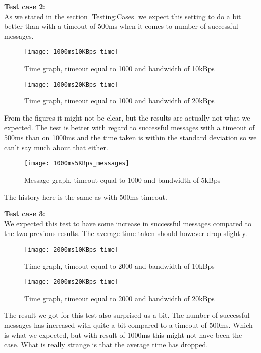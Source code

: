     \textbf{Test case 2:}\\
    As we stated in the section \ref{Testing:Cases} we expect this setting to do a bit better than with a timeout of 500ms when it comes to number of successful messages.
    \begin{figure}[H]
		\centering
		\texttt{[image: 1000ms10KBps\_time]}
		\caption{Time graph, timeout equal to 1000 and bandwidth of 10kBps} 
		\label{figure:results:1000ms10KBps_time}
	\end{figure}
	
	\begin{figure}[H]
		\centering
		\texttt{[image: 1000ms20KBps\_time]}
		\caption{Time graph, timeout equal to 1000 and bandwidth of 20kBps} 
		\label{figure:results:1000ms20KBps_time}
	\end{figure}
	
	From the figures it might not be clear, but the results are actually not what we expected. The test is better with regard to successful messages with a timeout of 500ms than on 1000ms and the time taken is within the standard deviation so we can't say much about that either.
	
	\begin{figure}[H]
		\centering
		\texttt{[image: 1000ms5KBps\_messages]}
		\caption{Message graph, timeout equal to 1000 and bandwidth of 5kBps} 
		\label{figure:results:1000ms5KBps_messages}
	\end{figure}
	
	The history here is the same as with 500ms timeout.
    
    \textbf{Test case 3:}\\
    We expected this test to have some increase in successful messages compared to the two previous results. The average time taken should however drop slightly.
    \begin{figure}[H]
		\centering
		\texttt{[image: 2000ms10KBps\_time]}
		\caption{Time graph, timeout equal to 2000 and bandwidth of 10kBps} 
		\label{figure:results:2000ms10KBps_time}
	\end{figure}
	
	\begin{figure}[H]
		\centering
		\texttt{[image: 2000ms20KBps\_time]}
		\caption{Time graph, timeout equal to 2000 and bandwidth of 20kBps} 
		\label{figure:results:2000ms20KBps_time}
	\end{figure}
	
	The result we got for this test also surprised us a bit. The number of successful messages has increased with quite a bit compared to a timeout of 500ms. Which is what we expected, but with result of 1000ms this might not have been the case. What is really strange is that the average time has dropped.
	
